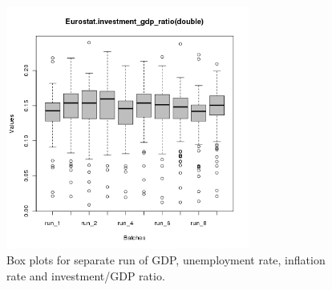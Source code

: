 \begin{figure}[ht!]
\begin{minipage}{17cm}
\includegraphics[width=8cm]{./batch/tax_0.05/Eurostat-investment_gdp_ratio-runbatch.png}
\end{minipage}
\caption{Box plots for separate run of GDP, unemployment rate, inflation rate and investment/GDP ratio.}
\label{Figure: run batch}
\end{figure}
